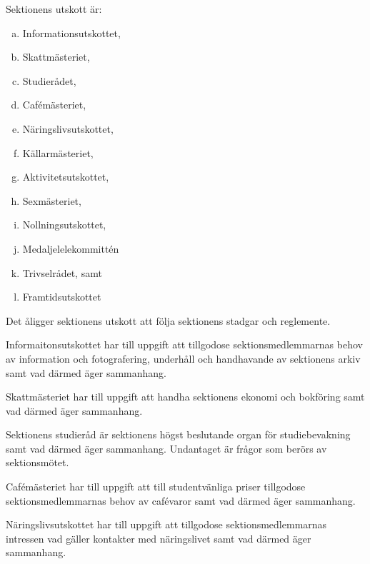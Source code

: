 \documentclass[stadgar]{dsekprotokoll}
\begin{document}
\begin{stadgeavsnitt}


Sektionens utskott är:
\begin{enumerate}[a)]
\item Informationsutskottet,
\item Skattmästeriet,
\item Studierådet,
\item Cafémästeriet,
\item Näringslivsutskottet,
\item Källarmästeriet,
\item Aktivitetsutskottet,
\item Sexmästeriet,
\item Nollningsutskottet,
\item Medaljelelekommittén
\item Trivselrådet, samt
\item Framtidsutskottet
\end{enumerate}


Det åligger sektionens utskott att följa sektionens stadgar och
reglemente.


Informaitonsutskottet har till uppgift att tillgodose sektionsmedlemmarnas behov av information och fotografering, underhåll och handhavande av sektionens arkiv samt vad därmed äger sammanhang.


Skattmästeriet har till uppgift att handha sektionens ekonomi och bokföring
samt vad därmed äger sammanhang.


Sektionens studieråd är sektionens högst beslutande organ för studiebevakning samt vad
därmed äger sammanhang. Undantaget är frågor som berörs av sektionsmötet.


Cafémästeriet har till uppgift att till studentvänliga priser tillgodose
sektionsmedlemmarnas behov av cafévaror samt vad därmed äger sammanhang.

Näringslivsutskottet har till uppgift att tillgodose sektionsmedlemmarnas
intressen vad gäller kontakter med näringslivet samt vad därmed äger
sammanhang.


\end{stadgeavsnitt}
\end{document}
